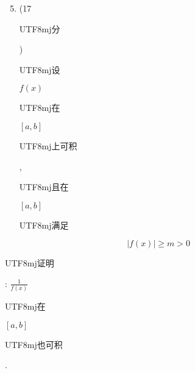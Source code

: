 \documentclass[10pt]{article}
\begin{document}
\begin{enumerate}
  \setcounter{enumi}{4}
  \item (17 \begin{CJK}{UTF8}{mj}分\end{CJK}) \begin{CJK}{UTF8}{mj}设\end{CJK} $f(x)$ \begin{CJK}{UTF8}{mj}在\end{CJK} $[a, b]$ \begin{CJK}{UTF8}{mj}上可积\end{CJK}, \begin{CJK}{UTF8}{mj}且在\end{CJK} $[a, b]$ \begin{CJK}{UTF8}{mj}满足\end{CJK}
\end{enumerate}
$$
|f(x)| \geqslant m>0
$$
\begin{CJK}{UTF8}{mj}证明\end{CJK}: $\frac{1}{f(x)}$ \begin{CJK}{UTF8}{mj}在\end{CJK} $[a, b]$ \begin{CJK}{UTF8}{mj}也可积\end{CJK}.
\end{document}

